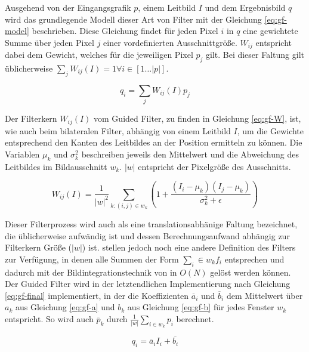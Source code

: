 Ausgehend von der Eingangsgrafik \(p\), einem Leitbild \(I\) und dem Ergebnisbild \(q\) wird das grundlegende Modell dieser Art von Filter mit der Gleichung \ref{eq:gf-model} beschrieben. Diese Gleichung findet für jeden Pixel \(i\) in \(q\) eine gewichtete Summe über jeden Pixel \(j\) einer vordefinierten Ausschnittgröße. \(W_{ij}\) entspricht dabei dem Gewicht, welches für die jeweiligen Pixel \(p_j\) gilt. Bei dieser Faltung gilt üblicherweise  \(\sum_{j} W_{ij}(I)=1 \forall i \in [1\ldots |p|]\). \citep{he2010guided}

\begin{equation} \label{eq:gf-model}
q_{i} = \sum_j W_{ij}(I)p_j
\end{equation}

Der Filterkern \(W_{ij}(I)\) vom Guided Filter, zu finden in Gleichung \ref{eq:gf-W}, ist, wie auch beim bilateralen Filter, abhängig von einem Leitbild \(I\), um die Gewichte entsprechend den Kanten des Leitbildes an der Position ermitteln zu können. Die Variablen \(\mu_k\) und \(\sigma^2_k\) beschreiben jeweils den Mittelwert und die Abweichung des Leitbildes im Bildausschnitt \(w_k\). \(|w|\) entspricht der Pixelgröße des Ausschnitts. \citep{he2010guided}

\begin{equation} \label{eq:gf-W}
W_{ij}(I) = \frac{1}{|w|^2} \sum_{k:(i,j) \in w_k} (1+\frac{(I_i-\mu_k)(I_j-\mu_k)}{\sigma^2_k + \epsilon})
\end{equation}

Dieser Filterprozess wird auch als eine translationsabhänige Faltung bezeichnet, die üblicherweise aufwändig ist und dessen Berechnungsaufwand abhängig zur Filterkern Größe (\(|w|\)) ist. \citet{he2010guided} stellen jedoch noch eine andere Definition des Filters zur Verfügung, in denen alle Summen der Form \(\sum_i\in w_k f_i\) entsprechen und dadurch mit der Bildintegrationstechnik von \citet{crow1984summed} in \(O(N)\) gelöst werden können. Der Guided Filter wird in der letztendlichen Implementierung nach Gleichung \ref{eq:gf-final} implementiert, in der die Koeffizienten \(\overline{a}_i\) und \(\overline{b}_i\) dem Mittelwert über \(a_k\) aus Gleichung \ref{eq:gf-a} und \(b_k\) aus Gleichung \ref{eq:gf-b} für jedes Fenster \(w_k\) entspricht. So wird auch \(\overline{p}_k\) durch \(\frac{1}{|w|} \sum_{i \in w_k} p_i\) berechnet.

\begin{equation} \label{eq:gf-final}
q_i = \overline{a}_iI_i+\overline{b_i}
\end{equation}

